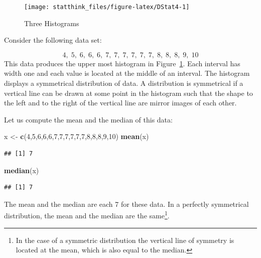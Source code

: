 \documentclass[]{krantz}
\makeatletter
\newenvironment{Shaded}{\begin{snugshade}}{\end{snugshade}}
\newcommand{\DecValTok}[1]{\textcolor[rgb]{0.00,0.00,0.81}{#1}}
\newcommand{\KeywordTok}[1]{\textcolor[rgb]{0.13,0.29,0.53}{\textbf{#1}}}
\newcommand{\NormalTok}[1]{#1}
\newcommand{\StringTok}[1]{\textcolor[rgb]{0.31,0.60,0.02}{#1}}
\newenvironment{kframe}{%
\medskip{}
\setlength{\fboxsep}{.8em}
 \def\at@end@of@kframe{}%
 \ifinner\ifhmode%
  \def\at@end@of@kframe{\end{minipage}}%
  \begin{minipage}{\columnwidth}%
 \fi\fi%
 \def\FrameCommand##1{\hskip\@totalleftmargin \hskip-\fboxsep
 \colorbox{shadecolor}{##1}\hskip-\fboxsep
     \hskip-\linewidth \hskip-\@totalleftmargin \hskip\columnwidth}%
 \MakeFramed {\advance\hsize-\width
   \@totalleftmargin\z@ \linewidth\hsize
   \@setminipage}}%
 {\par\unskip\endMakeFramed%
 \at@end@of@kframe}
\renewenvironment{Shaded}{\begin{kframe}}{\end{kframe}}
\theoremstyle{definition}
\theoremstyle{definition}
\theoremstyle{definition}
\theoremstyle{remark}
\makeatother
\begin{document}
\begin{figure}

{\centering \texttt{[image: statthink\_files/figure-latex/DStat4-1]} 

}

\caption{Three Histograms}\label{fig:DStat4}
\end{figure}

Consider the following data set:

\[4,\; 5,\; 6,\; 6,\; 6,\; 7,\; 7,\; 7,\; 7,\;  7,\;  7,\;  8,\;  8,\;  8,\;  9,\;  10\]
This data produces the upper most histogram in
Figure~\ref{fig:DStat4}. Each interval has width one and each
value is located at the middle of an interval. The histogram displays a
symmetrical distribution of data. A distribution is symmetrical if a
vertical line can be drawn at some point in the histogram such that the
shape to the left and to the right of the vertical line are mirror
images of each other.

Let us compute the mean and the median of this data:

\begin{Shaded}
\begin{Highlighting}[]
\NormalTok{x <-}\StringTok{ }\KeywordTok{c}\NormalTok{(}\DecValTok{4}\NormalTok{,}\DecValTok{5}\NormalTok{,}\DecValTok{6}\NormalTok{,}\DecValTok{6}\NormalTok{,}\DecValTok{6}\NormalTok{,}\DecValTok{7}\NormalTok{,}\DecValTok{7}\NormalTok{,}\DecValTok{7}\NormalTok{,}\DecValTok{7}\NormalTok{,}\DecValTok{7}\NormalTok{,}\DecValTok{7}\NormalTok{,}\DecValTok{8}\NormalTok{,}\DecValTok{8}\NormalTok{,}\DecValTok{8}\NormalTok{,}\DecValTok{9}\NormalTok{,}\DecValTok{10}\NormalTok{)}
\KeywordTok{mean}\NormalTok{(x)}
\end{Highlighting}
\end{Shaded}

\begin{verbatim}
## [1] 7
\end{verbatim}

\begin{Shaded}
\begin{Highlighting}[]
\KeywordTok{median}\NormalTok{(x)}
\end{Highlighting}
\end{Shaded}

\begin{verbatim}
## [1] 7
\end{verbatim}

The mean and the median are each 7 for these data. In a perfectly
symmetrical distribution, the mean and the median are the same\footnote{In the case of a symmetric distribution the vertical line of
  symmetry is located at the mean, which is also equal to the median.}.
\end{document}
